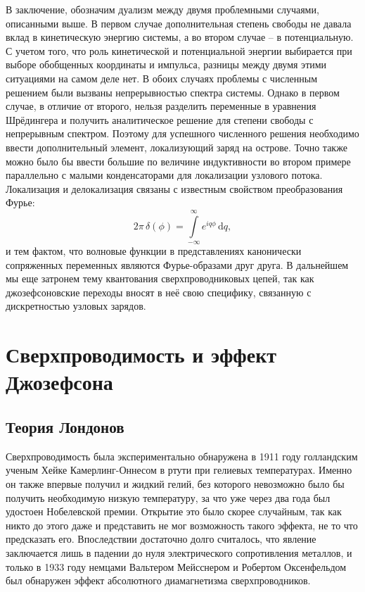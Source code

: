\documentclass[14pt, a4paper]{extreport}
\newcommand{\diff}{\,\mathrm{d}}
\numberwithin{equation}{section}
\begin{document}
В заключение, обозначим дуализм между двумя проблемными случаями, описанными выше. В первом случае дополнительная степень свободы не давала вклад в кинетическую энергию системы, а во втором случае -- в потенциальную. С учетом того, что роль кинетической и потенциальной энергии выбирается при выборе обобщенных координаты и импульса, разницы между двумя этими ситуациями на самом деле нет. В обоих случаях проблемы с численным решением были вызваны непрерывностью спектра системы. Однако в первом случае, в отличие от второго, нельзя разделить переменные в уравнения Шрёдингера и получить аналитическое решение для степени свободы с непрерывным спектром. Поэтому для успешного численного решения необходимо ввести дополнительный элемент, локализующий заряд на острове. Точно также можно было бы ввести большие по величине индуктивности во втором примере параллельно с малыми конденсаторами для локализации узлового потока. Локализация и делокализация связаны с известным свойством преобразования Фурье:
\begin{equation}
	2\pi\, \delta(\phi) = \int\limits_{-\infty}^{\infty} e^{iq\phi} \diff q,
\end{equation}
и тем фактом, что волновые функции в представлениях канонически сопряженных переменных являются Фурье-образами друг друга. В дальнейшем мы еще затронем тему квантования сверхпроводниковых цепей, так как джозефсоновские переходы вносят в неё свою специфику, связанную с дискретностью узловых зарядов.


\section{Сверхпроводимость и эффект Джозефсона}

\subsection{Теория Лондонов}

Сверхпроводимость была экспериментально обнаружена в 1911 году голландским ученым Хейке Камерлинг-Оннесом в ртути при гелиевых температурах. Именно он также впервые получил и жидкий гелий, без которого невозможно было бы получить необходимую низкую температуру, за что уже через два года был удостоен Нобелевской премии. Открытие это было скорее случайным, так как никто до этого даже и представить не мог возможность такого эффекта, не то что предсказать его. Впоследствии достаточно долго считалось, что явление заключается лишь в падении до нуля электрического сопротивления металлов, и только в 1933 году немцами Вальтером Мейсснером и Робертом Оксенфельдом был обнаружен эффект абсолютного диамагнетизма сверхпроводников. 
\end{document}
